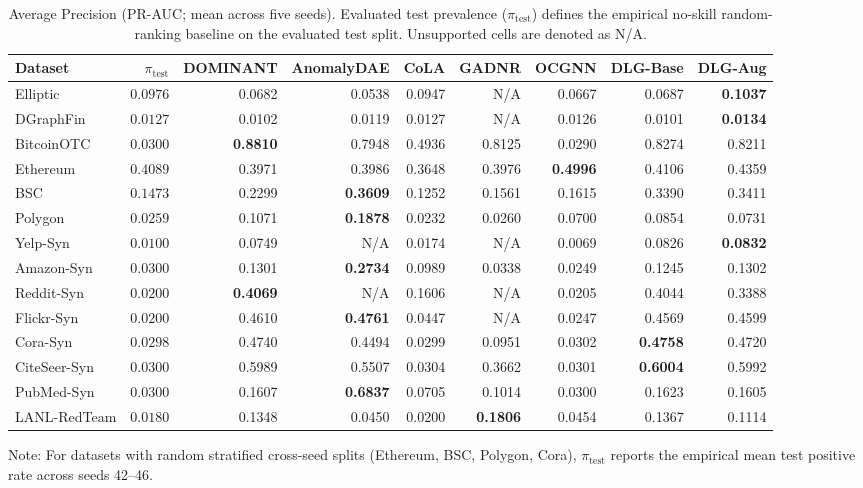 \documentclass[applsci,article,submit,moreauthors,pdftex]{Definitions/mdpi}
\begin{document}
\begin{table}[htbp]
\centering\footnotesize\setlength{\tabcolsep}{1.8pt}
\caption{Average Precision (PR-AUC; mean across five seeds). Evaluated test prevalence ($\pi_{\mathrm{test}}$) defines the empirical no-skill random-ranking baseline on the evaluated test split. Unsupported cells are denoted as N/A.}
\label{tab:pr_auc_main}
\begin{tabular*}{\textwidth}{@{\extracolsep{\fill}}lrrrrrrrr}\toprule
\textbf{Dataset} & $\pi_{\mathrm{test}}$ & \textbf{DOMINANT} & \textbf{AnomalyDAE} & \textbf{CoLA} & \textbf{GADNR} & \textbf{OCGNN} & \textbf{DLG-Base} & \textbf{DLG-Aug} \\\midrule
Elliptic & $0.0976$ & 0.0682 & 0.0538 & 0.0947 & N/A & 0.0667 & 0.0687 & \textbf{0.1037} \\
DGraphFin & $0.0127$ & 0.0102 & 0.0119 & 0.0127 & N/A & 0.0126 & 0.0101 & \textbf{0.0134} \\
BitcoinOTC & $0.0300$ & \textbf{0.8810} & 0.7948 & 0.4936 & 0.8125 & 0.0290 & 0.8274 & 0.8211 \\
Ethereum & $0.4089$ & 0.3971 & 0.3986 & 0.3648 & 0.3976 & \textbf{0.4996} & 0.4106 & 0.4359 \\
BSC & $0.1473$ & 0.2299 & \textbf{0.3609} & 0.1252 & 0.1561 & 0.1615 & 0.3390 & 0.3411 \\
Polygon & $0.0259$ & 0.1071 & \textbf{0.1878} & 0.0232 & 0.0260 & 0.0700 & 0.0854 & 0.0731 \\
Yelp-Syn & $0.0100$ & 0.0749 & N/A & 0.0174 & N/A & 0.0069 & 0.0826 & \textbf{0.0832} \\
Amazon-Syn & $0.0300$ & 0.1301 & \textbf{0.2734} & 0.0989 & 0.0338 & 0.0249 & 0.1245 & 0.1302 \\
Reddit-Syn & $0.0200$ & \textbf{0.4069} & N/A & 0.1606 & N/A & 0.0205 & 0.4044 & 0.3388 \\
Flickr-Syn & $0.0200$ & 0.4610 & \textbf{0.4761} & 0.0447 & N/A & 0.0247 & 0.4569 & 0.4599 \\
Cora-Syn & $0.0298$ & 0.4740 & 0.4494 & 0.0299 & 0.0951 & 0.0302 & \textbf{0.4758} & 0.4720 \\
CiteSeer-Syn & $0.0300$ & 0.5989 & 0.5507 & 0.0304 & 0.3662 & 0.0301 & \textbf{0.6004} & 0.5992 \\
PubMed-Syn & $0.0300$ & 0.1607 & \textbf{0.6837} & 0.0705 & 0.1014 & 0.0300 & 0.1623 & 0.1605 \\\midrule
LANL-RedTeam & $0.0180$ & 0.1348 & 0.0450 & 0.0200 & \textbf{0.1806} & 0.0454 & 0.1367 & 0.1114 \\\bottomrule
\end{tabular*}
\begin{tablenotes}\footnotesize
\item Note: For datasets with random stratified cross-seed splits (Ethereum, BSC, Polygon, Cora), $\pi_{\mathrm{test}}$ reports the empirical mean test positive rate across seeds 42--46.
\end{tablenotes}
\end{table}
\end{document}
